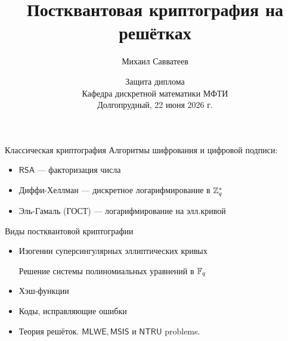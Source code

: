 \documentclass[notheorems]{beamer}
\title[Защита диплома ДМ]{Постквантовая криптография на решётках}
\author{Михаил Савватеев}
\institute[]{Научный руководитель: Алексей Фролов}
\date[22 июня 2026]{Защита диплома\\Кафедра дискретной математики МФТИ\\Долгопрудный, 22 июня 2026 г.}
\begin{document}


\frame{\titlepage}

\begin{frame}{Классическая криптография}
Алгоритмы шифрования и цифровой подписи:

\medskip
\begin{itemize}
	\item<2-> $\mathsf{RSA}$ --- факторизация числа
	\item<3-> Диффи-Хеллман --- дискретное логарифмирование в $\mathbb{Z}_q^*$
	\item<4-> Эль-Гамаль (ГОСТ) --- логарифмирование на элл.кривой
\end{itemize}

\bigskip
{}

\bigskip
{}

\end{frame}

\begin{frame}{Виды постквантовой криптографии}
\begin{itemize}
	\item<2-> Изогении суперсингулярных эллиптических кривых
	
	Решение системы полиномиальных уравнений в $\mathbb{F}_q$
	
	\smallskip
	
	\medskip
	\item<3-> Хэш-функции
	
	\smallskip
	\color{cyan}{Удобны для цифровой подписи. Нет полноценного шифрования.}
	
	\medskip
	\item<4-> Коды, исправляющие ошибки
	
	\smallskip
	\color{cyan}{Изучены, но неэффективны. Многие попытки ускорить уязвимы.}
	
	\medskip
	\item<5-> Теория решёток. $\mathsf{MLWE}, \mathsf{MSIS}$ и $\mathsf{NTRU}$ problems.
	
	\smallskip
	\color{green}{Быстры, надёжны и универсальны.}
\end{itemize}
\end{frame}
\end{document}
